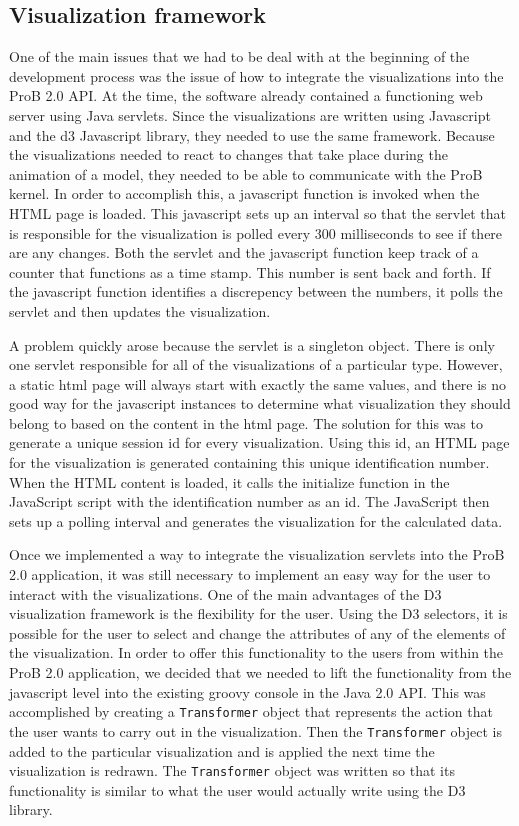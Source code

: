 \subsection{Visualization framework}

One of the main issues that we had to be deal with at the beginning of the development process was the issue of how to integrate the visualizations into the ProB 2.0 API. At the time, the software already contained a functioning web server using Java servlets. Since the visualizations are written using Javascript and the d3 Javascript library, they needed to use the same framework. Because the visualizations needed to react to changes that take place during the animation of a model, they needed to be able to communicate with the ProB kernel. In order to accomplish this, a javascript function is invoked when the HTML page is loaded. This javascript sets up an interval so that the servlet that is responsible for the visualization is polled every 300 milliseconds to see if there are any changes. Both the servlet and the javascript function keep track of a counter that functions as a time stamp. This number is sent back and forth. If the javascript function identifies a discrepency between the numbers, it polls the servlet and then updates the visualization.

A problem quickly arose because the servlet is a singleton object. There is only one servlet responsible for all of the visualizations of a particular type. However, a static html page will always start with exactly the same values, and there is no good way for the javascript instances to determine what visualization they should belong to based on the content in the html page. The solution for this was to generate a unique session id for every visualization. Using this id, an HTML page for the visualization is generated containing this unique identification number. When the HTML content is loaded, it calls the initialize function in the JavaScript script with the identification number as an id. The JavaScript then sets up a polling interval and generates the visualization for the calculated data.

Once we implemented a way to integrate the visualization servlets into the ProB 2.0 application, it was still necessary to implement an easy way for the user to interact with the visualizations. One of the main advantages of the D3 visualization framework is the flexibility for the user. Using the D3 selectors, it is possible for the user to select and change the attributes of any of the elements of the visualization. In order to offer this functionality to the users from within the ProB 2.0 application, we decided that we needed to lift the functionality from the javascript level into the existing groovy console in the Java 2.0 API. This was accomplished by creating a \texttt{Transformer} object that represents the action that the user wants to carry out in the visualization. Then the \texttt{Transformer} object is added to the particular visualization and is applied the next time the visualization is redrawn. The \texttt{Transformer} object was written so that its functionality is similar to what the user would actually write using the D3 library.

